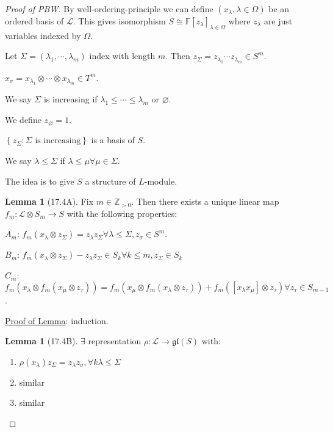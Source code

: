\documentclass{article}
\theoremstyle{definition}
\newtheorem{lemma}[theorem]{Lemma}
\begin{document}
    \begin{proof}
        [Proof of PBW]

        By well-ordering-principle we can define \((x_\lambda, \lambda \in \Omega)\) be an ordered basis of \(\mathcal{L}\). This gives isomorphism \(S \cong\mathbb{F}[z_{\lambda}]_{\lambda \in \Omega}\) where \(z_\lambda\) are just variables indexed by \(\Omega\).

        Let \(\Sigma = (\lambda_1, \cdots , \lambda_m)\) index with length \(m\). Then \(z_\Sigma = z_{\lambda_1} \cdots z_{\lambda_m} \in S^m\).

        \(x_\sigma = x_{\lambda_1} \otimes \cdots \otimes x_{\lambda_m} \in T^m\).

        We say \(\Sigma\) is increasing if \(\lambda_1 \leq \cdots \leq \lambda_m\) or \(\varnothing\).
        
        We define \(z_{\varnothing} = 1\).

        \(\left\{ z_\Sigma : \Sigma \text{ is increasing}  \right\}\) is a basis of \(S\).

        We say \(\lambda \leq \Sigma\) if \(\lambda \leq \mu \forall \mu \in \Sigma\).

        The idea is to give \(S\) a structure of \(L\)-module.

        \begin{lemma}
            [17.4A] Fix \(m\in \mathbb{Z}_{>0}\). Then there exists a unique linear map \(f_m: \mathcal{L} \otimes S_m \to S\) with the following properties:

            \(A_m\): \(f_m(x_\lambda \otimes z_\Sigma) = z_\lambda z_\Sigma \forall \lambda \leq \Sigma , z_\sigma \in S^m\).

            \(B_m\): \(f_m(x_\lambda \otimes z_\Sigma)- z_\lambda z_\Sigma \in S_k \forall k \leq m, z_\Sigma \in S_k\)

            \(C_m\): \(f_m(x_\lambda \otimes f_m(x_\mu \otimes z_{\tau} )) = f_m(x_\mu \otimes f_m(x_\lambda \otimes z_{\tau})) + f_m([x_\lambda x_\mu] \otimes z_{\tau}) \forall z_{\tau} \in S_{m-1}\).
        \end{lemma}

        \underline{Proof of Lemma}: induction.

        \begin{lemma}
            [17.4B] \(\exists\) representation \(\rho : \mathcal{L} \to \mathfrak{gl}(S)\) with:

            \begin{enumerate}[label=\alph*)]
                \item \(\rho(x_\lambda) z_\Sigma = z_\lambda z_\sigma, \forall k\lambda \leq \Sigma\)
                \item similar
                \item similar 
            \end{enumerate} 
        \end{lemma}


\end{proof}
\end{document}

